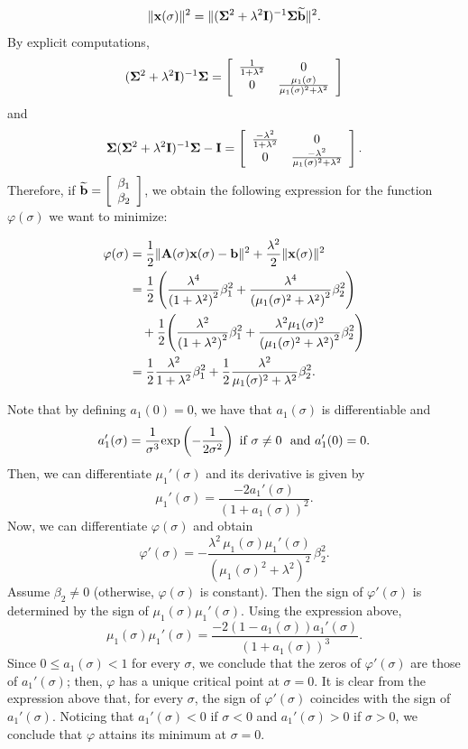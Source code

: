 \documentclass[onefignum,onetabnum]{siamart171218}
\newcommand{\bA}{{\bf A}}
\newcommand{\bI}{{\bf I}}
\newcommand{\bb}{{\bf b}}
\newcommand{\bx}{{\bf x}}
\newcommand{\bSigma}{{\bf \Sigma}}
\begin{document}
\[ \| \bx(\sigma)\|^2 = \| (\bSigma^2 + \lambda^2 \bI)^{-1} \bSigma \widetilde{\bb} \|^2.\]
By explicit computations, 
\[ (\bSigma^2 + \lambda^2 \bI)^{-1} \bSigma = \left[ \begin{array}{cc} \frac{1}{1+\lambda^2} & 0 \\  0 & \frac{\mu_1(\sigma)}{\mu_1(\sigma)^2+\lambda^2} \end{array}\right]\]
and
\[ \bSigma (\bSigma^2 + \lambda^2 \bI)^{-1} \bSigma  - \bI =  \left[ \begin{array}{cc} \frac{-\lambda^2}{1+\lambda^2} & 0 \\  0 & \frac{-\lambda^2}{\mu_1(\sigma)^2+\lambda^2} \end{array}\right].\] 
Therefore, if $\widetilde{\bb} = \left[ \begin{array}{c} \beta_1 \\ \beta_2\end{array}\right]$, we obtain
the following expression for the function $\varphi(\sigma)$ we want to minimize:

\begin{align*} 
\varphi(\sigma) &= \frac{1}{2} \| \bA(\sigma) \bx(\sigma) - \bb\|^2 + \frac{\lambda^2}{2} \| \bx(\sigma)\|^2 \\
&= \frac{1}{2} \left(\frac{\lambda^4}{\left(1 +\lambda^2\right)^2} \beta_1^2 +  \frac{\lambda^4}{\left(\mu_1(\sigma)^2+\lambda^2\right)^2} \beta_2^2 \right) \\ & \quad + \frac{1}{2}\Bigg(\frac{\lambda^2}{\left(1 +\lambda^2\right)^2} \beta_1^2 +  \frac{\lambda^2\mu_1(\sigma)^2}{\left(\mu_1(\sigma)^2+\lambda^2\right)^2} \beta_2^2 \Bigg)\\
&= \frac{1}{2}\frac{\lambda^2}{1 +\lambda^2} \beta_1^2 +  \frac{1}{2}\frac{\lambda^2}{\mu_1(\sigma)^2 +\lambda^2} \beta_2^2.   
\end{align*}

Note that by defining $a_1(0) = 0$, we have that $a_1(\sigma)$ is differentiable and 
\[a_1'(\sigma) = \frac{1}{\sigma^3}\mbox{exp}\left(-\frac{1}{2 \sigma^2}\right) \hbox{ if }  \sigma\ne 0  \ \hbox{ and } a_1'(0) = 0.\]
Then, we can differentiate $\mu_1'(\sigma)$ and its derivative is given by 
\[
\mu_1'(\sigma)= \frac{-2a_1'(\sigma)}{(1+a_1(\sigma))^2}.
\]
Now, we can differentiate $\varphi(\sigma)$ and obtain
\[
\varphi'(\sigma)
=
-\frac{\lambda^2\,\mu_1(\sigma)\mu_1'(\sigma)}
{\left(\mu_1(\sigma)^2+\lambda^2\right)^2}\,\beta_2^2.
\]
Assume $\beta_2 \ne 0$ (otherwise, $\varphi(\sigma)$ is constant). Then the sign of
$\varphi'(\sigma)$ is determined by the sign of $\mu_1(\sigma)\mu_1'(\sigma)$.
Using the expression above,
\[
\mu_1(\sigma)\mu_1'(\sigma)
=
\frac{-2\left(1-a_1(\sigma)\right)a_1'(\sigma)}{(1+a_1(\sigma))^3}.
\]
Since $0\le a_1(\sigma)<1$ for every $\sigma$, we conclude that the zeros of $\varphi'(\sigma)$ are those of $a_1'(\sigma)$; then, $\varphi$ has a unique critical point at $\sigma=0$. It is clear from the expression above that, for every $\sigma$, the sign of $\varphi'(\sigma)$ coincides with the sign of $a_1'(\sigma)$. Noticing that $a_1'(\sigma) <0$ if $\sigma<0$ and $a_1'(\sigma)>0$ if $\sigma>0$, we conclude that $\varphi$ attains its minimum at $\sigma=0$.
\end{document}
